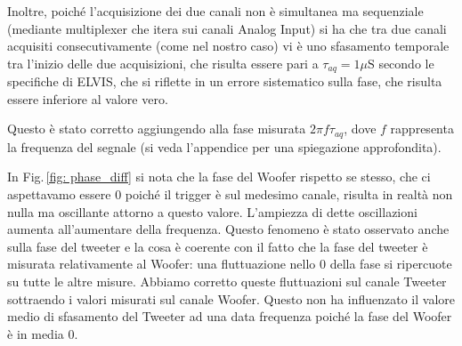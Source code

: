 \documentclass[../Relazione_circuiti]{subfiles}
\begin{document}
  Inoltre, poiché l'acquisizione dei due canali non è simultanea ma sequenziale (mediante multiplexer che itera sui
  canali Analog Input) si ha che tra due canali acquisiti consecutivamente (come nel nostro caso) vi è uno sfasamento
  temporale tra l'inizio delle due acquisizioni, che risulta essere pari a $\tau_{aq}=1 \mu \mathrm{S}$
      secondo le specifiche di ELVIS, che si riflette in un errore sistematico sulla fase, che risulta essere inferiore
      al valore vero.

      Questo è stato corretto aggiungendo alla fase misurata  $ 2 \pi f \tau_{aq}$, dove $f$
      rappresenta la frequenza del segnale (si veda l'appendice per una spiegazione approfondita).

      In Fig.\,\ref{fig: phase_diff}
      si nota che la fase del Woofer rispetto se stesso, che ci aspettavamo essere 0 poiché il trigger è sul medesimo
      canale, risulta in realtà non nulla ma oscillante attorno a questo valore. L'ampiezza di dette oscillazioni
      aumenta all'aumentare della frequenza. Questo fenomeno è stato osservato anche sulla fase del tweeter e la cosa è
      coerente con il fatto che la fase del tweeter è misurata relativamente al Woofer: una fluttuazione nello 0 della
      fase si ripercuote su tutte le altre misure. Abbiamo corretto queste fluttuazioni sul canale Tweeter sottraendo i
      valori misurati sul canale Woofer. Questo non ha influenzato il valore medio di sfasamento del Tweeter ad una data
      frequenza poiché la fase del Woofer è in media 0.
\end{document}
